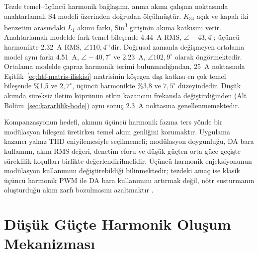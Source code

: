 Tezde temel--üçüncü harmonik bağlaşımı, anma akımı çalışma noktasında anahtarlamalı S4 modeli üzerinden doğrudan ölçülmüştür. $K_{34}$ açık ve kapalı iki benzetim arasındaki $L_1$ akımı farkı, Sin\textsuperscript{3} girişinin akıma katkısını verir. Anahtarlamalı modelde fark temel bileşende \SI{4.44}{\ampere} RMS, $\angle-43{,}4^{\circ}$; üçüncü harmonikte \SI{2.32}{\ampere} RMS, $\angle110{,}4^{\circ}$'dir. Doğrusal zamanla değişmeyen ortalama model aynı farkı \SI{4.51}{\ampere}, $\angle-40{,}7^{\circ}$ ve \SI{2.23}{\ampere}, $\angle102{,}9^{\circ}$ olarak öngörmektedir. Ortalama modelde çapraz harmonik terimi bulunmadığından, \SI{25}{\ampere} noktasında Eşitlik~\eqref{eq:htf-matris-iliskisi} matrisinin köşegen dışı katkısı en çok temel bileşende \%1,5 ve $2{,}7^{\circ}$, üçüncü harmonikte \%3,8 ve $7{,}5^{\circ}$ düzeyindedir. Düşük akımda süreksiz iletim köprünün etkin kazancını frekansla değiştirdiğinden (Alt Bölüm~\ref{sec:kararlilik-bode}) aynı sonuç \SI{2.3}{\ampere} noktasına genellenmemektedir.

Kompanzasyonun hedefi, akımın üçüncü harmonik fazına ters yönde bir modülasyon bileşeni üretirken temel akım genliğini korumaktır. Uygulama kazancı yalnız THD eniyilemesiyle seçilmemeli; modülasyon doygunluğu, DA bara kullanımı, akım RMS değeri, denetim eforu ve düşük güçten orta güce geçişte süreklilik koşulları birlikte değerlendirilmelidir. Üçüncü harmonik enjeksiyonunun modülasyon kullanımını değiştirebildiği bilinmektedir; tezdeki amaç ise klasik üçüncü harmonik PWM ile DA bara kullanımını artırmak değil, nötr susturmanın oluşturduğu akım zarfı bozulmasını azaltmaktır \citep{Holmes2003}.

\section{Düşük Güçte Harmonik Oluşum Mekanizması}
\label{sec:harmonik-mekanizma}

